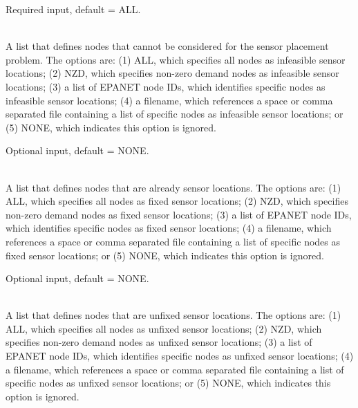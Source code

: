 \begin{description}[topsep=0pt,parsep=0.5em,itemsep=-0.4em]
\begin{description}[topsep=0pt,parsep=0.5em,itemsep=-0.4em]
\begin{description}[topsep=0pt,parsep=0.5em,itemsep=-0.4em]
                Required input, default = ALL.
      \item[{infeasible nodes}]\hfill
\\A list that defines nodes that cannot be considered for the sensor placement problem.
                The options are:
                (1) ALL, which specifies all nodes as infeasible sensor locations;
                (2) NZD, which specifies non-zero demand nodes as infeasible sensor locations;
                (3) a list of EPANET node IDs, which identifies specific nodes as infeasible sensor locations;
                (4) a filename, which references a space or comma separated file containing a list of 
                specific nodes as infeasible sensor locations; or
                (5) NONE, which indicates this option is ignored.
                
                Optional input, default = NONE.
      \item[{fixed nodes}]\hfill
\\A list that defines nodes that are already sensor locations.
                The options are:
                (1) ALL, which specifies all nodes as fixed sensor locations;
                (2) NZD, which specifies non-zero demand nodes as fixed sensor locations;
                (3) a list of EPANET node IDs, which identifies specific nodes as fixed sensor locations; 
                (4) a filename, which references a space or comma separated file containing a list of 
                specific nodes as fixed sensor locations; or
                (5) NONE, which indicates this option is ignored.
                
                Optional input, default = NONE.
      \item[{unfixed nodes}]\hfill
\\A list that defines nodes that are unfixed sensor locations.
                The options are:
                (1) ALL, which specifies all nodes as unfixed sensor locations;
                (2) NZD, which specifies non-zero demand nodes as unfixed sensor locations;
                (3) a list of EPANET node IDs, which identifies specific nodes as unfixed sensor locations; 
                (4) a filename, which references a space or comma separated file containing a list of 
                specific nodes as unfixed sensor locations; or
                (5) NONE, which indicates this option is ignored.
                

\end{description}
\end{description}
\end{description}

